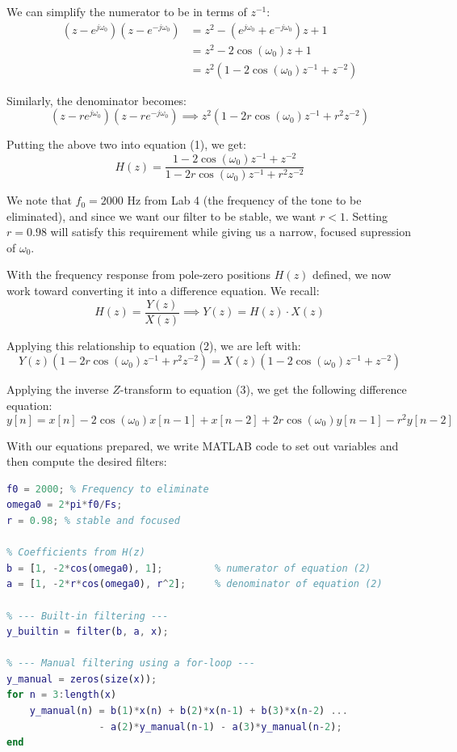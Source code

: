 \documentclass{article}
\begin{document}
We can simplify the numerator to be in terms of $z^{-1}$:
\begin{align*}
    \left(z - e^{j\omega_0}\right)\left(z - e^{-j\omega_0}\right)
    &= z^2 - \left(e^{j\omega_0} + e^{-j\omega_0}\right)z + 1 \\
    &= z^2 - 2\cos(\omega_0)z + 1 \\
    &= z^2 \left(1 - 2\cos(\omega_0)z^{-1} + z^{-2}\right)
\end{align*}

Similarly, the denominator becomes:
\[
(z-re^{j\omega_0})(z-re^{-j\omega_0}) \implies z^2 \left(1 - 2r\cos(\omega_0)z^{-1} + r^2z^{-2}\right)
\]

Putting the above two into equation (1), we get:
\begin{equation}
    H(z) = \frac{1 - 2\cos(\omega_0)z^{-1} + z^{-2}}
                {1 - 2r\cos(\omega_0)z^{-1} + r^2z^{-2}}
\end{equation}

We note that $f_0 = 2000 \text{ Hz}$ from Lab 4 (the frequency of the tone to be eliminated), and since we want our filter to be stable, we want $r < 1$. Setting $r = 0.98$ will satisfy this requirement while giving us a narrow, focused supression of $\omega_0$.

With the frequency response from pole-zero positions $H(z)$ defined, we now work toward converting it into a difference equation. We recall:
\[
H(z) = \frac{Y(z)}{X(z)} \implies Y(z) = H(z) \cdot X(z)
\]

Applying this relationship to equation (2), we are left with:
\begin{equation}
    Y(z)(1 - 2r\cos(\omega_0)z^{-1} + r^2z^{-2}) = X(z)(1 - 2\cos(\omega_0)z^{-1} + z^{-2})
\end{equation}

Applying the inverse $Z$-transform to equation (3), we get the following difference equation:
\begin{equation}
y[n] = x[n] - 2\cos(\omega_0)x[n-1] + x[n-2] + 2r\cos(\omega_0)y[n-1] - r^2 y[n-2]
\end{equation}

\newpage

With our equations prepared, we write MATLAB code to set out variables and then compute the desired filters:

\begin{lstlisting}[caption={MATLAB code to filter the audio signal.}, label={lst:audio_filtering}, language=Matlab]
% Target tone to remove
f0 = 2000; % Frequency to eliminate
omega0 = 2*pi*f0/Fs;
r = 0.98; % stable and focused        

% Coefficients from H(z)
b = [1, -2*cos(omega0), 1];         % numerator of equation (2)
a = [1, -2*r*cos(omega0), r^2];     % denominator of equation (2)

% --- Built-in filtering ---
y_builtin = filter(b, a, x);

% --- Manual filtering using a for-loop ---
y_manual = zeros(size(x));
for n = 3:length(x)
    y_manual(n) = b(1)*x(n) + b(2)*x(n-1) + b(3)*x(n-2) ...
                - a(2)*y_manual(n-1) - a(3)*y_manual(n-2);
end
\end{lstlisting}
\end{document}
